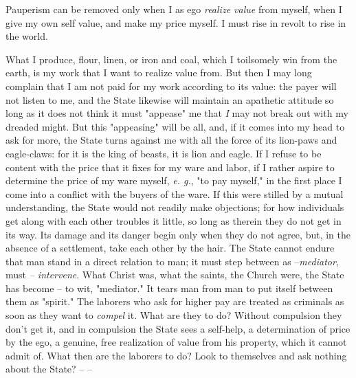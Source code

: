 \documentclass[a4paper]{book}
\begin{document}
Pauperism can be removed only when I as ego \textit{realize value} from 
myself, when I give my own self value, and make my price myself. I must rise 
in revolt to rise in the world.

What I produce, flour, linen, or iron and coal, which I toilsomely win from 
the earth, is my work that I want to realize value from. But then I may long 
complain that I am not paid for my work according to its value: the payer will 
not listen to me, and the State likewise will maintain an apathetic attitude 
so long as it does not think it must "{}appease"{} me that \textit{I} may not 
break out with my dreaded might. But this "{}appeasing"{} will be all, and, if 
it comes into my head to ask for more, the State turns against me with all the 
force of its lion-paws and eagle-claws: for it is the king of beasts, it is 
lion and eagle. If I refuse to be content with the price that it fixes for my 
ware and labor, if I rather aspire to determine the price of my ware myself, 
\textit{e. g.}, "{}to pay myself,"{} in the first place I come into a conflict 
with the buyers of the ware. If this were stilled by a mutual understanding, 
the State would not readily make objections; for how individuals get along 
with each other troubles it little, so long as therein they do not get in its 
way. Its damage and its danger begin only when they do not agree, but, in the 
absence of a settlement, take each other by the hair. The State cannot endure 
that man stand in a direct relation to man; it must step between as 
--\textit{mediator}, must \textit{-- intervene}. What Christ was, what the 
saints, the Church were, the State has become -- to wit, "{}mediator."{} It 
tears man from man to put itself between them as "{}spirit."{} The laborers 
who ask for higher pay are treated as criminals as soon as they want to 
\textit{compel} it. What are they to do? Without compulsion they don't get it, 
and in compulsion the State sees a self-help, a determination of price by the 
ego, a genuine, free realization of value from his property, which it cannot 
admit of. What then are the laborers to do? Look to themselves and ask nothing 
about the State? -- --
\end{document}
